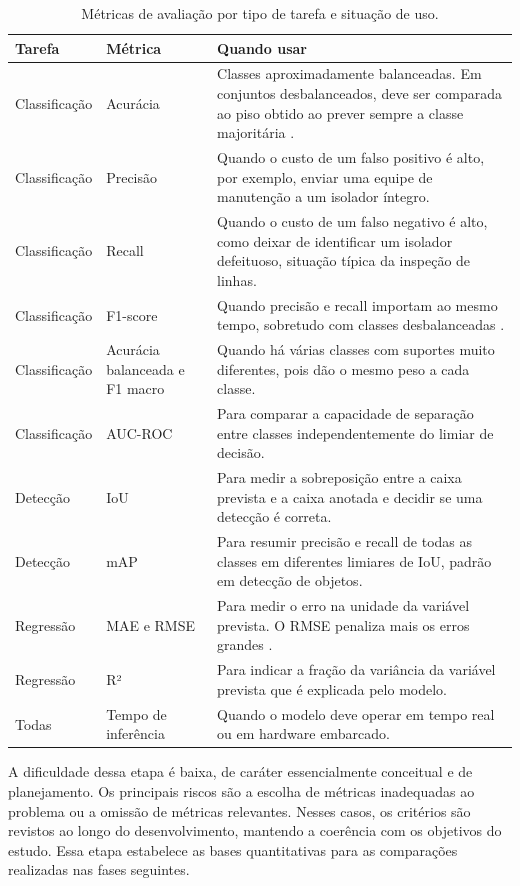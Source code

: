 \begin{table}[H]
\centering
\caption{\label{tab:metricas_por_tarefa}Métricas de avaliação por tipo de tarefa e situação de uso.}
\small
\begin{tabular}{|p{2.6cm}|p{3.6cm}|p{8.3cm}|}
\hline
\textbf{Tarefa} & \textbf{Métrica} & \textbf{Quando usar} \\
\hline
Classificação & Acurácia & Classes aproximadamente balanceadas. Em conjuntos desbalanceados, deve ser comparada ao piso obtido ao prever sempre a classe majoritária \cite{he2009learning}. \\
\hline
Classificação & Precisão & Quando o custo de um falso positivo é alto, por exemplo, enviar uma equipe de manutenção a um isolador íntegro. \\
\hline
Classificação & Recall & Quando o custo de um falso negativo é alto, como deixar de identificar um isolador defeituoso, situação típica da inspeção de linhas. \\
\hline
Classificação & F1-score & Quando precisão e recall importam ao mesmo tempo, sobretudo com classes desbalanceadas \cite{sokolova2009systematic}. \\
\hline
Classificação & Acurácia balanceada e F1 macro & Quando há várias classes com suportes muito diferentes, pois dão o mesmo peso a cada classe. \\
\hline
Classificação & AUC-ROC & Para comparar a capacidade de separação entre classes independentemente do limiar de decisão. \\
\hline
Detecção & IoU & Para medir a sobreposição entre a caixa prevista e a caixa anotada e decidir se uma detecção é correta. \\
\hline
Detecção & mAP & Para resumir precisão e recall de todas as classes em diferentes limiares de IoU, padrão em detecção de objetos. \\
\hline
Regressão & MAE e RMSE & Para medir o erro na unidade da variável prevista. O RMSE penaliza mais os erros grandes \cite{goodfellow2016deep}. \\
\hline
Regressão & R² & Para indicar a fração da variância da variável prevista que é explicada pelo modelo. \\
\hline
Todas & Tempo de inferência & Quando o modelo deve operar em tempo real ou em hardware embarcado. \\
\hline
\end{tabular}
\end{table}

A dificuldade dessa etapa é baixa, de caráter essencialmente conceitual e de planejamento. Os principais riscos são a escolha de métricas inadequadas ao problema ou a omissão de métricas relevantes. Nesses casos, os critérios são revistos ao longo do desenvolvimento, mantendo a coerência com os objetivos do estudo. Essa etapa estabelece as bases quantitativas para as comparações realizadas nas fases seguintes.

